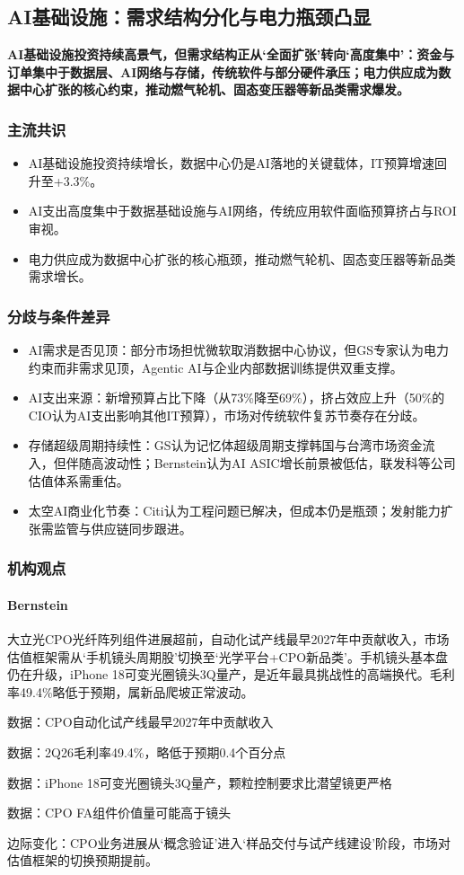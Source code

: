 \documentclass[11pt]{ctexart}
\begin{document}
\subsection{AI基础设施：需求结构分化与电力瓶颈凸显}
\textbf{AI基础设施投资持续高景气，但需求结构正从‘全面扩张’转向‘高度集中’：资金与订单集中于数据层、AI网络与存储，传统软件与部分硬件承压；电力供应成为数据中心扩张的核心约束，推动燃气轮机、固态变压器等新品类需求爆发。}
\subsubsection*{主流共识}
\begin{itemize}
  \item AI基础设施投资持续增长，数据中心仍是AI落地的关键载体，IT预算增速回升至+3.3\%。
  \item AI支出高度集中于数据基础设施与AI网络，传统应用软件面临预算挤占与ROI审视。
  \item 电力供应成为数据中心扩张的核心瓶颈，推动燃气轮机、固态变压器等新品类需求增长。
\end{itemize}
\subsubsection*{分歧与条件差异}
\begin{itemize}
  \item AI需求是否见顶：部分市场担忧微软取消数据中心协议，但GS专家认为电力约束而非需求见顶，Agentic AI与企业内部数据训练提供双重支撑。
  \item AI支出来源：新增预算占比下降（从73\%降至69\%），挤占效应上升（50\%的CIO认为AI支出影响其他IT预算），市场对传统软件复苏节奏存在分歧。
  \item 存储超级周期持续性：GS认为记忆体超级周期支撑韩国与台湾市场资金流入，但伴随高波动性；Bernstein认为AI ASIC增长前景被低估，联发科等公司估值体系需重估。
  \item 太空AI商业化节奏：Citi认为工程问题已解决，但成本仍是瓶颈；发射能力扩张需监管与供应链同步跟进。
\end{itemize}
\subsubsection*{机构观点}
\paragraph{Bernstein} 大立光CPO光纤阵列组件进展超前，自动化试产线最早2027年中贡献收入，市场估值框架需从‘手机镜头周期股’切换至‘光学平台+CPO新品类’。手机镜头基本盘仍在升级，iPhone 18可变光圈镜头3Q量产，是近年最具挑战性的高端换代。毛利率49.4\%略低于预期，属新品爬坡正常波动。
{\small\color{refgray}数据：CPO自动化试产线最早2027年中贡献收入\par}
{\small\color{refgray}数据：2Q26毛利率49.4\%，略低于预期0.4个百分点\par}
{\small\color{refgray}数据：iPhone 18可变光圈镜头3Q量产，颗粒控制要求比潜望镜更严格\par}
{\small\color{refgray}数据：CPO FA组件价值量可能高于镜头\par}
{\small\color{refgray}边际变化：CPO业务进展从‘概念验证’进入‘样品交付与试产线建设’阶段，市场对估值框架的切换预期提前。\par}
\end{document}
